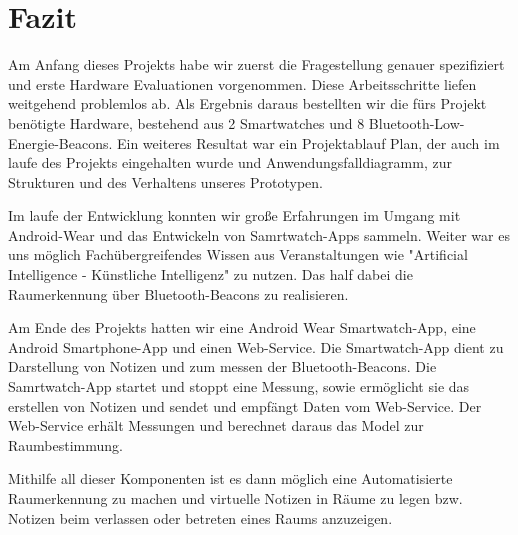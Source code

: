 \section{Fazit}

Am Anfang dieses Projekts habe wir zuerst die Fragestellung genauer spezifiziert und erste Hardware Evaluationen vorgenommen. Diese Arbeitsschritte liefen weitgehend problemlos ab. Als Ergebnis daraus bestellten wir die fürs Projekt benötigte Hardware, bestehend aus 2 Smartwatches und 8 Bluetooth-Low-Energie-Beacons. Ein weiteres Resultat war ein Projektablauf Plan, der auch im laufe des Projekts eingehalten wurde und Anwendungsfalldiagramm, zur Strukturen und des Verhaltens unseres Prototypen. 

Im laufe der Entwicklung konnten wir große Erfahrungen im Umgang mit Android-Wear und das Entwickeln von Samrtwatch-Apps sammeln. Weiter war es uns möglich Fachübergreifendes Wissen aus Veranstaltungen wie "Artificial Intelligence - Künstliche Intelligenz" zu nutzen. Das half dabei die Raumerkennung über Bluetooth-Beacons zu realisieren.

Am Ende des Projekts hatten wir eine Android Wear Smartwatch-App, eine Android Smartphone-App und einen Web-Service. Die Smartwatch-App dient zu Darstellung von Notizen und zum messen der Bluetooth-Beacons. Die Samrtwatch-App startet und stoppt eine Messung, sowie ermöglicht sie das erstellen von Notizen und sendet und empfängt Daten vom Web-Service. Der Web-Service erhält Messungen und berechnet daraus das Model zur Raumbestimmung.

Mithilfe all dieser Komponenten ist es dann möglich eine Automatisierte Raumerkennung zu machen und virtuelle Notizen in Räume zu legen bzw. Notizen beim verlassen oder betreten eines Raums anzuzeigen.